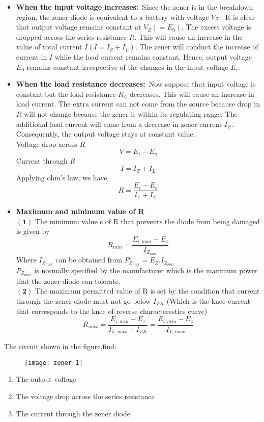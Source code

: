 \begin{itemize}
\item \textbf{When the input voltage increases:}\
Since the zener is in the breakdown region, the zener diode is equivalent to a battery with voltage $V z$ . It is clear that output voltage remains constant at $V_{Z}\left(=E_{0}\right)$. The excess voltage is dropped across the series resistance $R$. This will cause an increase in the value of total current $I(I=I_Z+I_L)$. The zener will conduct the increase of current in $I$ while the load current remains constant. Hence, output voltage $E_{0}$ remains constant irrespective of the changes in the input voltage $E_{i}$.
\item \textbf{When the load resistance decreases:}\
Now suppose that input voltage is constant but the load resistance $R_{L}$ decreases. This will cause an increase in load current. The extra current can not come from the source because drop in $R$  will not change because the zener is within its regulating range. The additional load current will come from a decrease in zener current $I_{Z}$. Consequently, the output voltage stays at constant value.\\
Voltage drop across $R$
$$V=E_{i}-E_{o}$$
Current through $R$ $$I=I_{Z}+I_{L}$$
Applying ohm's law, we have,
$$
R=\frac{E_{i}-E_{o}}{l_{Z}+I_{L}}
$$
\item \textbf{Maximum and minimum value of R}\\
$\mathbf{(1)}$ The minimum value s of R that prevents the diode from being damaged is given by \\
$$R_{min}=\frac{E_{i,max}-E_{z}}{I_{Z_{max}}}$$
Where $I_{Z_{max}}$ can be obtained from $P_{Z_{max}}=E_{Z}.I_{Z_{max}}$\\
$P_{Z_{max}}$ is normally specified by the manufacturer which is the maximum power that the zener diode can tolerate.\\
$\mathbf{(2)}$ The maximum permitted value of R is set by the condition that current through the zener diode must not go below $I_{ZK}$ (Which is the knee current that corresponds to the knee of reverse characterestics curve)
$$R_{max}=\frac{E_{i,min}-E_{z}}{I_{L,max}+I_{ZK}}=\frac{E_{i,min}-E_{z}}{I_{L,max}}$$
\end{itemize}
\begin{exercise}
The circuit shown in the figure,find:
\begin{figure}[H]
	\centering
	\texttt{[image: zener 1]}
	\caption{}
	\label{}
\end{figure}
\begin{enumerate}
	\item  The output voltage
	\item The voltage drop across the series resistance
	\item The current through the zener diode
\end{enumerate}

\end{exercise}
